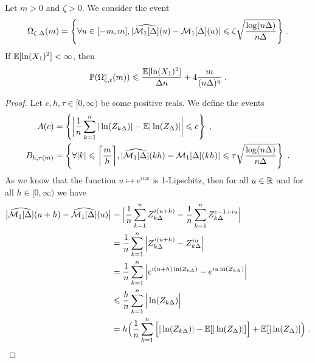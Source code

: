 \begin{lemma}
\label{lm:Mellin1}
Let $m > 0$ and $\zeta > 0$. We consider the event
    \begin{equation*}
        \Omega_{\zeta, \Delta}(m) = \Bigg\{ 
            \forall u \in [-m, m], |\widehat{\mathcal{M}_1[\Delta]}(u) - \mathcal{M}_1[\Delta](u) |
            \leqslant
            \zeta \sqrt{\frac{\log(n \Delta)}{n \Delta}}
        \Bigg\}
        \; .
    \end{equation*}
 If $\mathbb{E}[\ln(X_1)^2] < \infty$, then
 \begin{equation*}
      \mathbb{P}(\Omega_{\zeta, t}^c(m)) \leqslant \frac{\mathbb{E}[\ln(X_1)^2]}{\Delta n} + 4 \frac{m}{(n \Delta)^{\eta}}
      \; .
 \end{equation*}
\end{lemma}
\begin{proof}
Let $c, h, \tau \in [0, \infty)$ be some positive reals. We define the events
    \begin{align*}
        A(c) 
        &= \left\{ \bigg| \frac{1}{n} \sum_{k = 1}^n |\ln(Z_{k\Delta})| - \mathbb{E}|\ln(Z_{\Delta})|  \bigg| \leqslant c \right\} 
        \; ,
        \\
        B_{h, \tau(m)} 
        &= \left\{ \forall |k| \leqslant \bigg\lceil \frac{m}{h} \bigg\rceil, |\widehat{\mathcal{M}_1[\Delta]}(k h) - \mathcal{M}_1[\Delta](k h) | \leqslant \tau \sqrt{\frac{\log(n \Delta)}{n \Delta}}
        \right\}   \; . 
     \end{align*}
    As we know that the function $u \mapsto e^{iux}$ is 1-Lipschitz, then for all $u \in \mathbb{R}$ and for all $h \in [0, \infty)$ we have
    \begin{subequations}
    \begin{align*}
        \big| \widehat{\mathcal{M}_1[\Delta]}(u + h) - \widehat{\mathcal{M}_1[\Delta]}(u) \big|
        & = \Big|  \frac{1}{n} \sum_{k = 1}^{n} Z_{k\Delta}^{i(u+h)} -  \frac{1}{n} \sum_{k = 1}^{n} Z_{k\Delta}^{c - 1 + iu}  \Big| \\
        & =  \frac{1}{n} \sum_{k = 1}^{n}  \Big|  Z_{k\Delta}^{i(u+h)} -   Z_{k\Delta}^{iu}  \Big| \\
        & =  \frac{1}{n} \sum_{k = 1}^{n} \Big| e^{i(u+h)\ln(Z_{k\Delta})} -   e^{iu \ln(Z_{k\Delta})}  \Big| \\
        &\leqslant  \frac{h}{n}\sum_{k = 1}^n \Big| \ln(Z_{k\Delta}) \Big| \\
        &= h \Big( \frac{1}{n} \sum_{k = 1}^n \Big[ |\ln(Z_{k\Delta})| - \mathbb{E}[|\ln(Z_{\Delta})|] \Big] +  \mathbb{E}[|\ln(Z_{\Delta})| \Big)
        \; .
    \end{align*}

\end{subequations}
\end{proof}
